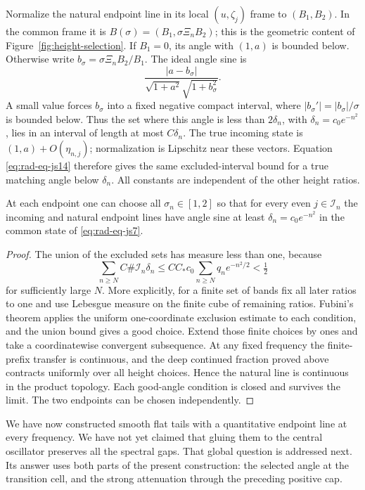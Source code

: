 Normalize the natural endpoint line in its local $(u,\zeta_j)$ frame
to $(B_1,B_2)$.  In the common frame it is
$B(\sigma)=(B_1,\sigma\Xi_nB_2)$; this is the geometric content of
Figure~\ref{fig:height-selection}.  If $B_1=0$, its angle with
$(1,a)$ is bounded below.  Otherwise write
$b_\sigma=\sigma\Xi_nB_2/B_1$.  The ideal angle sine is
\[
 \frac{|a-b_\sigma|}{\sqrt{1+a^2}\sqrt{1+b_\sigma^2}}.
\]
A small value forces $b_\sigma$ into a fixed negative compact interval,
where $|b_\sigma'|=|b_\sigma|/\sigma$ is bounded below.  Thus the set
where this angle is less than $2\delta_n$, with
$\delta_n=c_0e^{-n^2}$, lies in an interval of length at most
$C\delta_n$.  The true incoming state is $(1,a)+O(\eta_{n,j})$;
normalization is Lipschitz near these vectors.  Equation
\eqref{eq:rad-eq-js14} therefore gives the same excluded-interval bound
for a true matching angle below $\delta_n$.
All constants are independent of the other height ratios.

\begin{lemma}\label{lem:radial-product-selection}
At each endpoint one can choose all $\sigma_n\in[1,2]$ so that for
every even $j\in\mathcal I_n$ the incoming and natural endpoint
lines have angle sine at least $\delta_n=c_0e^{-n^2}$ in the common
state of \eqref{eq:rad-eq-js7}.
\end{lemma}
\begin{proof}
The union of the excluded sets has measure less than one, because
\begin{equation}\label{eq:rad-eq-js13}
 \sum_{n\ge N}C\#\mathcal I_n\delta_n
 \le CC_*c_0\sum_{n\ge N}q_ne^{-n^2/2}<\tfrac12
\end{equation}
for sufficiently large $N$.
More explicitly, for a finite set of bands fix all later ratios to one
and use Lebesgue measure on the finite cube of remaining ratios.
Fubini's theorem applies the uniform one-coordinate exclusion estimate
to each condition, and the union bound gives a good choice.
Extend those finite choices by ones and take a coordinatewise convergent
subsequence.  At any fixed frequency the finite-prefix transfer is
continuous, and the deep continued fraction proved above contracts
uniformly over all height choices.  Hence the natural line is continuous
in the product topology.  Each good-angle condition is closed and
survives the limit.  The two endpoints can be chosen independently.
\end{proof}

We have now constructed smooth flat tails with a quantitative endpoint
line at every frequency.  We have not yet claimed that gluing them to
the central oscillator preserves all the spectral gaps.  That global
question is addressed next.  Its answer uses both parts of the present
construction: the selected angle at the transition cell, and the strong
attenuation through the preceding positive cap.
